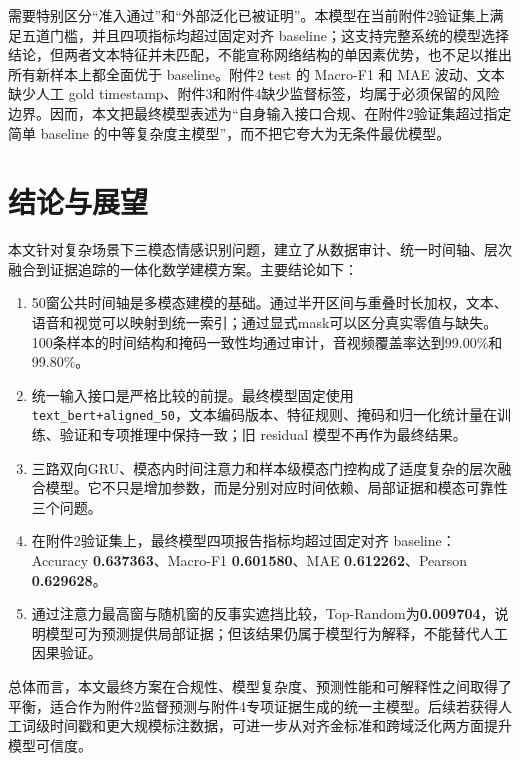 \documentclass{gmcmthesis}
\newcommand{\code}[1]{\texttt{#1}}
\newcommand{\keymetric}[1]{\textbf{#1}}
\begin{document}
\par\indent 需要特别区分“准入通过”和“外部泛化已被证明”。本模型在当前附件2验证集上满足五道门槛，并且四项指标均超过固定对齐 baseline；这支持完整系统的模型选择结论，但两者文本特征并未匹配，不能宣称网络结构的单因素优势，也不足以推出所有新样本上都全面优于 baseline。附件2 test 的 Macro-F1 和 MAE 波动、文本缺少人工 gold timestamp、附件3和附件4缺少监督标签，均属于必须保留的风险边界。因而，本文把最终模型表述为“自身输入接口合规、在附件2验证集超过指定简单 baseline 的中等复杂度主模型”，而不把它夸大为无条件最优模型。

\clearpage
\section{结论与展望}
本文针对复杂场景下三模态情感识别问题，建立了从数据审计、统一时间轴、层次融合到证据追踪的一体化数学建模方案。主要结论如下：
\begin{enumerate}[label=结论\arabic*.,leftmargin=4em]
\item 50窗公共时间轴是多模态建模的基础。通过半开区间与重叠时长加权，文本、语音和视觉可以映射到统一索引；通过显式mask可以区分真实零值与缺失。100条样本的时间结构和掩码一致性均通过审计，音视频覆盖率达到99.00\%和99.80\%。
\item 统一输入接口是严格比较的前提。最终模型固定使用 \code{text\_bert+aligned\_50}，文本编码版本、特征规则、掩码和归一化统计量在训练、验证和专项推理中保持一致；旧 residual 模型不再作为最终结果。
\item 三路双向GRU、模态内时间注意力和样本级模态门控构成了适度复杂的层次融合模型。它不只是增加参数，而是分别对应时间依赖、局部证据和模态可靠性三个问题。
\item 在附件2验证集上，最终模型四项报告指标均超过固定对齐 baseline：Accuracy \keymetric{0.637363}、Macro-F1 \keymetric{0.601580}、MAE \keymetric{0.612262}、Pearson \keymetric{0.629628}。
\item 通过注意力最高窗与随机窗的反事实遮挡比较，Top-Random为\keymetric{0.009704}，说明模型可为预测提供局部证据；但该结果仍属于模型行为解释，不能替代人工因果验证。
\end{enumerate}
\par\indent 总体而言，本文最终方案在合规性、模型复杂度、预测性能和可解释性之间取得了平衡，适合作为附件2监督预测与附件4专项证据生成的统一主模型。后续若获得人工词级时间戳和更大规模标注数据，可进一步从对齐金标准和跨域泛化两方面提升模型可信度。
\end{document}
